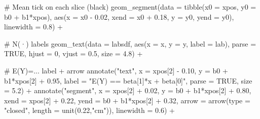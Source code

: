 \documentclass[
  letterpaper,
  DIV=11,
  numbers=noendperiod]{scrreprt}
\newenvironment{Shaded}{\begin{snugshade}}{\end{snugshade}}
\newcommand{\AttributeTok}[1]{\textcolor[rgb]{0.40,0.45,0.13}{#1}}
\newcommand{\CommentTok}[1]{\textcolor[rgb]{0.37,0.37,0.37}{#1}}
\newcommand{\ConstantTok}[1]{\textcolor[rgb]{0.56,0.35,0.01}{#1}}
\newcommand{\DecValTok}[1]{\textcolor[rgb]{0.68,0.00,0.00}{#1}}
\newcommand{\FloatTok}[1]{\textcolor[rgb]{0.68,0.00,0.00}{#1}}
\newcommand{\FunctionTok}[1]{\textcolor[rgb]{0.28,0.35,0.67}{#1}}
\newcommand{\NormalTok}[1]{\textcolor[rgb]{0.00,0.23,0.31}{#1}}
\newcommand{\SpecialCharTok}[1]{\textcolor[rgb]{0.37,0.37,0.37}{#1}}
\newcommand{\StringTok}[1]{\textcolor[rgb]{0.13,0.47,0.30}{#1}}
\begin{document}
\begin{Shaded}
\begin{Highlighting}[]
  \CommentTok{\# Mean tick on each slice (black)}
  \FunctionTok{geom\_segment}\NormalTok{(}\AttributeTok{data =} \FunctionTok{tibble}\NormalTok{(}\AttributeTok{x0 =}\NormalTok{ xpos, }\AttributeTok{y0 =}\NormalTok{ b0 }\SpecialCharTok{+}\NormalTok{ b1}\SpecialCharTok{*}\NormalTok{xpos),}
               \FunctionTok{aes}\NormalTok{(}\AttributeTok{x =}\NormalTok{ x0 }\SpecialCharTok{{-}} \FloatTok{0.02}\NormalTok{, }\AttributeTok{xend =}\NormalTok{ x0 }\SpecialCharTok{+} \FloatTok{0.18}\NormalTok{, }\AttributeTok{y =}\NormalTok{ y0, }\AttributeTok{yend =}\NormalTok{ y0),}
               \AttributeTok{linewidth =} \FloatTok{0.8}\NormalTok{) }\SpecialCharTok{+}

  \CommentTok{\# N(·) labels}
  \FunctionTok{geom\_text}\NormalTok{(}\AttributeTok{data =}\NormalTok{ labsdf,}
            \FunctionTok{aes}\NormalTok{(}\AttributeTok{x =}\NormalTok{ x, }\AttributeTok{y =}\NormalTok{ y, }\AttributeTok{label =}\NormalTok{ lab),}
            \AttributeTok{parse =} \ConstantTok{TRUE}\NormalTok{, }\AttributeTok{hjust =} \DecValTok{0}\NormalTok{, }\AttributeTok{vjust =} \FloatTok{0.5}\NormalTok{, }\AttributeTok{size =} \FloatTok{4.8}\NormalTok{) }\SpecialCharTok{+}

  \CommentTok{\# E(Y)=... label + arrow}
  \FunctionTok{annotate}\NormalTok{(}\StringTok{"text"}\NormalTok{,}
           \AttributeTok{x =}\NormalTok{ xpos[}\DecValTok{2}\NormalTok{] }\SpecialCharTok{{-}} \FloatTok{0.10}\NormalTok{, }\AttributeTok{y =}\NormalTok{ b0 }\SpecialCharTok{+}\NormalTok{ b1}\SpecialCharTok{*}\NormalTok{xpos[}\DecValTok{2}\NormalTok{] }\SpecialCharTok{+} \FloatTok{0.95}\NormalTok{,}
           \AttributeTok{label =} \StringTok{"E(Y) == beta[1]*x + beta[0]"}\NormalTok{, }\AttributeTok{parse =} \ConstantTok{TRUE}\NormalTok{, }\AttributeTok{size =} \FloatTok{5.2}\NormalTok{) }\SpecialCharTok{+}
  \FunctionTok{annotate}\NormalTok{(}\StringTok{"segment"}\NormalTok{,}
           \AttributeTok{x =}\NormalTok{ xpos[}\DecValTok{2}\NormalTok{] }\SpecialCharTok{+} \FloatTok{0.02}\NormalTok{, }\AttributeTok{y =}\NormalTok{ b0 }\SpecialCharTok{+}\NormalTok{ b1}\SpecialCharTok{*}\NormalTok{xpos[}\DecValTok{2}\NormalTok{] }\SpecialCharTok{+} \FloatTok{0.80}\NormalTok{,}
           \AttributeTok{xend =}\NormalTok{ xpos[}\DecValTok{2}\NormalTok{] }\SpecialCharTok{+} \FloatTok{0.22}\NormalTok{, }\AttributeTok{yend =}\NormalTok{ b0 }\SpecialCharTok{+}\NormalTok{ b1}\SpecialCharTok{*}\NormalTok{xpos[}\DecValTok{2}\NormalTok{] }\SpecialCharTok{+} \FloatTok{0.32}\NormalTok{,}
           \AttributeTok{arrow =} \FunctionTok{arrow}\NormalTok{(}\AttributeTok{type =} \StringTok{"closed"}\NormalTok{, }\AttributeTok{length =} \FunctionTok{unit}\NormalTok{(}\FloatTok{0.22}\NormalTok{,}\StringTok{"cm"}\NormalTok{)),}
           \AttributeTok{linewidth =} \FloatTok{0.6}\NormalTok{) }\SpecialCharTok{+}


\end{Highlighting}
\end{Shaded}
\end{document}
